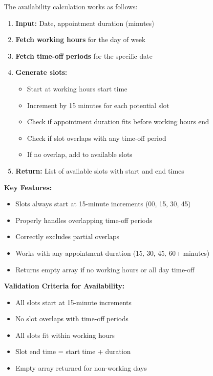\documentclass[12pt,a4paper]{article}
\begin{document}
The availability calculation works as follows:

\begin{enumerate}
    \item \textbf{Input:} Date, appointment duration (minutes)
    \item \textbf{Fetch working hours} for the day of week
    \item \textbf{Fetch time-off periods} for the specific date
    \item \textbf{Generate slots:}
    \begin{itemize}
        \item Start at working hours start time
        \item Increment by 15 minutes for each potential slot
        \item Check if appointment duration fits before working hours end
        \item Check if slot overlaps with any time-off period
        \item If no overlap, add to available slots
    \end{itemize}
    \item \textbf{Return:} List of available slots with start and end times
\end{enumerate}

\textbf{Key Features:}
\begin{itemize}
    \item Slots always start at 15-minute increments (00, 15, 30, 45)
    \item Properly handles overlapping time-off periods
    \item Correctly excludes partial overlaps
    \item Works with any appointment duration (15, 30, 45, 60+ minutes)
    \item Returns empty array if no working hours or all day time-off
\end{itemize}

\begin{successbox}
\textbf{Validation Criteria for Availability:}
\begin{itemize}
    \item All slots start at 15-minute increments
    \item No slot overlaps with time-off periods
    \item All slots fit within working hours
    \item Slot end time = start time + duration
    \item Empty array returned for non-working days
\end{itemize}
\end{successbox}
\end{document}
